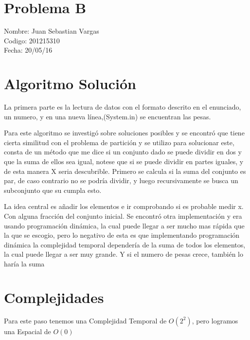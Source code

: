 \documentclass{article}
\begin{document}
\section*{Problema B}
Nombre: Juan Sebastian Vargas\\
 Codigo: 201215310\\
Fecha: 20/05/16

\section{Algoritmo Soluci\'on}
La primera parte es la lectura de datos con el formato descrito en el enunciado, un numero, y en una nueva línea,(System.in) se encuentran las pesas.

Para este algoritmo se investigó sobre soluciones posibles y se encontró que tiene cierta similitud con el problema de partición y se utilizo para solucionar este, consta de un método que me dice si un conjunto dado se puede dividir en dos y que la suma de ellos sea igual, notese que si se puede dividir en partes iguales, y de esta manera X seria descubrible. Primero se calcula si la suma del conjunto es par, de caso contrario no se podría dividir, y luego recursivamente se busca un subconjunto que su cumpla esto. 


La idea central es añadir los elementos e ir comprobando si es probable medir x. Con alguna fracción del conjunto inicial. 
Se encontró otra implementación y era usando programación dinámica, la cual puede llegar a ser mucho mas rápida que la que se escogio, pero lo negativo de esta es que implementando programación dinámica la complejidad temporal dependería de la suma de todos los elementos, la cual puede llegar a ser muy grande. Y si el numero de pesas crece, también lo haría la suma

\section{Complejidades}

 Para este paso tenemos una Complejidad Temporal de  $O(2^2)$, pero logramos una Espacial de $O(0)$
\end{document}
